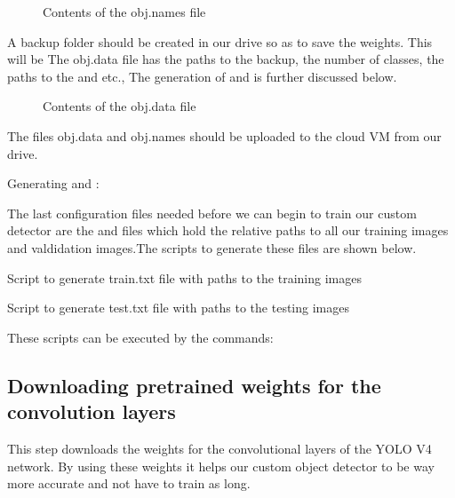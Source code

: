 \begin{figure}[H]
	\centering
	\caption{Contents of the obj.names file}
\end{figure}

A backup folder should be created in our drive so as to save the weights. This will be 
The obj.data file has the paths to the backup, the number of classes, the paths to the  and  etc., 
The generation of  and  is further discussed below. 
\begin{figure}[H]
	\centering
	\caption{Contents of the obj.data file}
\end{figure}

The files obj.data and obj.names should be uploaded to the cloud VM from our drive. 



Generating  and  : 

The last configuration files needed before we can begin to train our custom detector are the  and  files which hold the relative paths to all our training images and valdidation images.The scripts to generate these files are shown below.\cite{TheAIGuy:2021}

\begin{code}[H]
	
	\caption{Script to generate train.txt file with paths to the training images}\label{TensorFlow:Complete}
\end{code}

\begin{code}[H]
	
	\caption{Script to generate test.txt file with paths to the testing images}\label{TensorFlow:Complete}
\end{code}

These scripts can be executed by the commands:



\subsection{Downloading pretrained weights for the convolution layers}
This step downloads the weights for the convolutional layers of the YOLO V4 network. By using these weights it helps our custom object detector to be way more accurate and not have to train as long.

